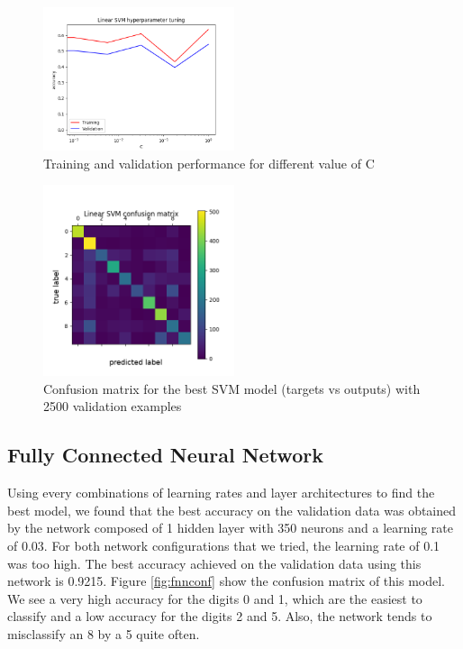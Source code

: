 \documentclass[letterpaper, 10 pt, conference]{ieeeconf}  %
\begin{document}
\begin{figure}[h]
	\begin{center}
			\includegraphics[width=0.5\textwidth]{figures/svm_tuning.png}  %
		\caption{Training and validation performance for different value of C}
		\label{fig:svmtuning}
	\end{center}
\end{figure}
\begin{figure}[h]
	\begin{center}
			\includegraphics[width=0.5\textwidth]{figures/svm_conf.png}  %
		\caption{Confusion matrix for the best SVM model (targets vs outputs) with 2500 validation examples}
		\label{fig:svmconf}
	\end{center}
\end{figure}


\subsection{Fully Connected Neural Network}
Using every combinations of learning rates and layer architectures to find the best model, we found that the best accuracy on the validation data was obtained by the network composed of 1 hidden layer with 350 neurons and a learning rate of 0.03. For both network configurations that we tried, the learning rate of 0.1 was too high. The best accuracy achieved on the validation data using this network is 0.9215. Figure \ref{fig:fnnconf} show the confusion matrix of this model. We see a very high accuracy for the digits 0 and 1, which are the easiest to classify and a low accuracy for the digits 2 and 5. Also, the network tends to misclassify an 8 by a 5 quite often.
\end{document}
